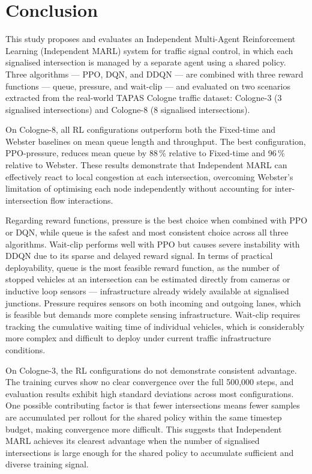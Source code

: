 \renewcommand{\tablename}{Table}
\renewcommand{\figurename}{Figure}

\chapter*{Conclusion}

This study proposes and evaluates an Independent Multi-Agent Reinforcement
Learning (Independent MARL) system for traffic signal control, in which each
signalised intersection is managed by a separate agent using a shared policy.
Three algorithms --- PPO, DQN, and DDQN --- are combined with three reward
functions --- queue, pressure, and wait-clip --- and evaluated on two scenarios
extracted from the real-world TAPAS Cologne traffic dataset: Cologne-3
(3 signalised intersections) and Cologne-8 (8 signalised intersections).

On Cologne-8, all RL configurations outperform both the Fixed-time and Webster
baselines on mean queue length and throughput. The best configuration,
PPO-pressure, reduces mean queue by 88\,\% relative to Fixed-time and 96\,\%
relative to Webster. These results demonstrate that Independent MARL can
effectively react to local congestion at each intersection, overcoming
Webster's limitation of optimising each node independently without accounting
for inter-intersection flow interactions.

Regarding reward functions, pressure is the best choice when combined with PPO
or DQN, while queue is the safest and most consistent choice across all three
algorithms. Wait-clip performs well with PPO but causes severe instability with
DDQN due to its sparse and delayed reward signal. In terms of practical
deployability, queue is the most feasible reward function, as the number of
stopped vehicles at an intersection can be estimated directly from cameras or
inductive loop sensors --- infrastructure already widely available at signalised
junctions. Pressure requires sensors on both incoming and outgoing lanes,
which is feasible but demands more complete sensing infrastructure. Wait-clip
requires tracking the cumulative waiting time of individual vehicles,
which is considerably more complex and difficult to deploy under current
traffic infrastructure conditions.

On Cologne-3, the RL configurations do not demonstrate consistent advantage.
The training curves show no clear convergence over the full 500{,}000 steps,
and evaluation results exhibit high standard deviations across most
configurations. One possible contributing factor is that fewer intersections
means fewer samples are accumulated per rollout for the shared policy within
the same timestep budget, making convergence more difficult. This suggests that
Independent MARL achieves its clearest advantage when the number of signalised
intersections is large enough for the shared policy to accumulate sufficient
and diverse training signal.

